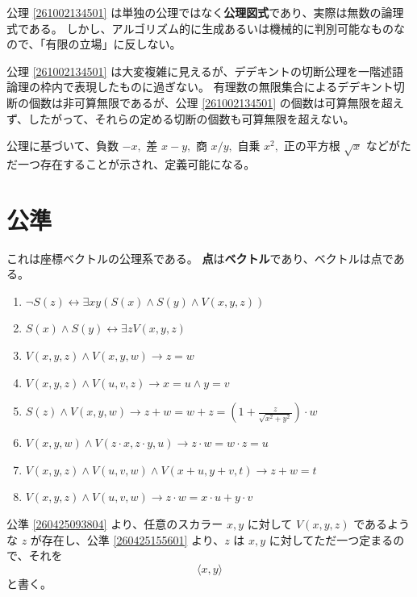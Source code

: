 公理 \ref{261002134501} は単独の公理ではなく\textbf{公理図式}であり、実際は無数の論理式である。
しかし、アルゴリズム的に生成あるいは機械的に判別可能なものなので、「有限の立場」に反しない。

公理 \ref{261002134501} は大変複雑に見えるが、デデキントの切断公理を一階述語論理の枠内で表現したものに過ぎない。
有理数の無限集合によるデデキント切断の個数は非可算無限であるが、公理 \ref{261002134501} の個数は可算無限を超えず、したがって、それらの定める切断の個数も可算無限を超えない。

公理に基づいて、負数 \(-x,\) 差 \(x-y,\) 商 \(x/y,\) 自乗 \(x^2,\) 正の平方根 \(\sqrt{x}\) などがただ一つ存在することが示され、定義可能になる。


\section{公準}

これは座標ベクトルの公理系である。
\textbf{点}は\textbf{ベクトル}であり、ベクトルは点である。

\begin{enumerate}
  \item \(\lnot S(z)\leftrightarrow\exists xy(S(x)\land S(y)\land V(x,y,z))\)
  \item\label{260425093804} \(S(x)\land S(y)\leftrightarrow \exists zV(x,y,z)\)
  \item\label{260425155601} \(V(x,y,z)\land V(x,y,w)\rightarrow z=w\)
  \item \(V(x,y,z)\land V(u,v,z)\rightarrow x=u\land y=v\)
  \item\label{260425093803} \(\displaystyle S(z)\land V(x,y,w)\rightarrow z+w=w+z=\left(1+\frac{z}{\sqrt{x^2+y^2}}\right)\cdot w\)
  \item \(V(x,y,w)\land V(z\cdot x,z\cdot y,u)\rightarrow z\cdot w=w\cdot z=u\)
  \item \(V(x,y,z)\land V(u,v,w)\land V(x+u,y+v,t)\rightarrow z+w=t\)
  \item \(V(x,y,z)\land V(u,v,w)\rightarrow z\cdot w=x\cdot u+y\cdot v\)
\end{enumerate}


\begin{dfn}\label{260419033901}
  公準 \ref{260425093804} より、任意のスカラー \(x,y\) に対して \(V(x,y,z)\) であるような \(z\) が存在し、公準 \ref{260425155601} より、\(z\) は \(x,y\) に対してただ一つ定まるので、それを
  \[\langle x,y\rangle\]
  と書く。
\end{dfn}

